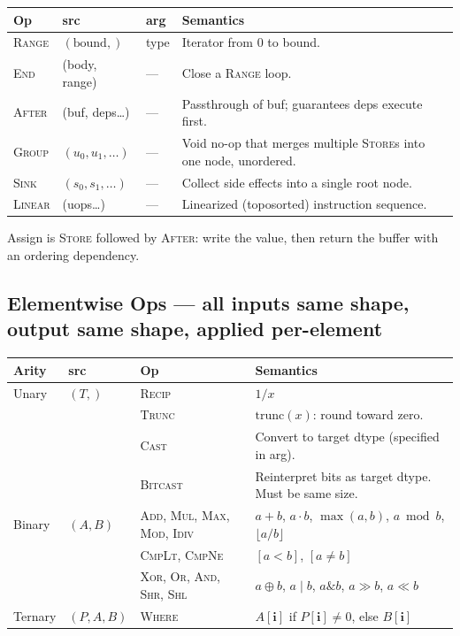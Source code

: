 \documentclass[10pt,letterpaper]{article}
\newcommand{\op}[1]{\textsc{#1}}
\begin{document}
\begin{tabular}{@{}l l l p{6.0cm}@{}}
\toprule
\textbf{Op} & \textbf{src} & \textbf{arg} & \textbf{Semantics} \\
\midrule
\op{Range} & $(\text{bound},)$ & type & Iterator from $0$ to bound. \\
\op{End} & (body, range) & --- & Close a \op{Range} loop. \\
\op{After} & (buf, deps\ldots) & --- & Passthrough of buf; guarantees deps execute first. \\
\op{Group} & $(u_0, u_1, \ldots)$ & --- & Void no-op that merges multiple \op{Store}s into one node, unordered. \\
\op{Sink} & $(s_0, s_1, \ldots)$ & --- & Collect side effects into a single root node. \\
\op{Linear} & (uops\ldots) & --- & Linearized (toposorted) instruction sequence. \\
\bottomrule
\end{tabular}

\smallskip
Assign is \op{Store} followed by \op{After}: write the value, then return the buffer with an ordering dependency.

\subsection*{{\color{elwyellow}Elementwise Ops} \normalfont\small--- all inputs same shape, output same shape, applied per-element}

\begin{tabular}{@{}l l l l@{}}
\toprule
\textbf{Arity} & \textbf{src} & \textbf{Op} & \textbf{Semantics} \\
\midrule
Unary & $(T,)$
  & \op{Recip}
  & $1/x$ \\
& & \op{Trunc}
  & $\mathrm{trunc}(x)$: round toward zero. \\
& & \op{Cast}
  & Convert to target dtype (specified in arg). \\
& & \op{Bitcast}
  & Reinterpret bits as target dtype. Must be same size. \\[4pt]
Binary & $(A, B)$
  & \op{Add}, \op{Mul}, \op{Max}, \op{Mod}, \op{Idiv}
  & $a+b$, $a \cdot b$, $\max(a,b)$, $a \bmod b$, $\lfloor a/b \rfloor$ \\
& & \op{CmpLt}, \op{CmpNe}
  & $[a < b]$, $[a \ne b]$ \\
& & \op{Xor}, \op{Or}, \op{And}, \op{Shr}, \op{Shl}
  & $a \oplus b$, $a \mid b$, $a \mathbin{\&} b$, $a \gg b$, $a \ll b$ \\[4pt]
Ternary & $(P, A, B)$
  & \op{Where}
  & $A[\mathbf{i}]$ if $P[\mathbf{i}] \ne 0$, else $B[\mathbf{i}]$ \\

\bottomrule
\end{tabular}
\end{document}

